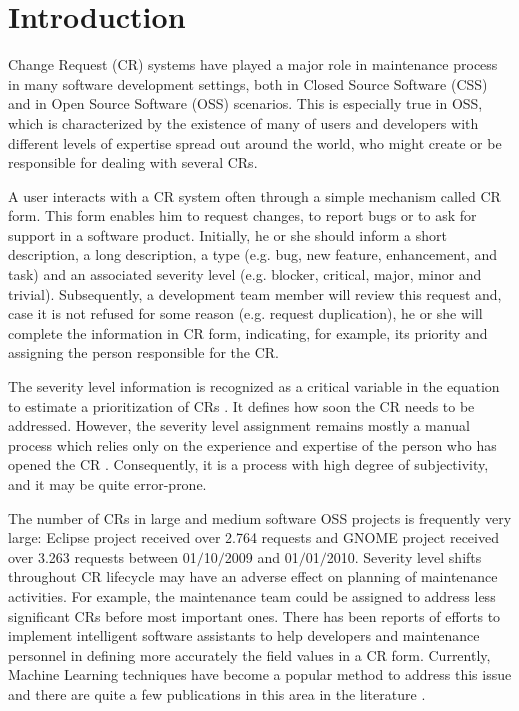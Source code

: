 \section{Introduction}
Change Request (CR) systems have played a major role in maintenance process in many software development settings, both in Closed Source Software (CSS) and in Open Source Software (OSS) scenarios. This is especially true in OSS, which is characterized by the existence of many of users and developers with different levels of expertise spread out around the world, who might create or be responsible for dealing with several CRs\cite{Cavalcanti2014}.

A user interacts with a CR system often through a simple mechanism called CR form. This form enables him to request changes, to report bugs or to ask for support in a software product\cite{Sommerville2010}. Initially, he or she should inform a short description, a long description, a type (e.g. bug, new feature, enhancement, and task) and an associated severity level (e.g. blocker, critical, major, minor and trivial). Subsequently, a development team member will review this request and, case it is not refused for some reason (e.g. request duplication), he or she will complete the information in CR form, indicating, for example, its priority and assigning the person responsible for the CR. 

The severity level information is recognized as a critical variable in the equation to estimate a prioritization of CRs \cite{Tian2012}. It defines how soon the CR needs to be addressed\cite{Lamkanfi2010}. However, the severity level assignment remains mostly a manual process which relies only on the experience and expertise of the person who has opened the CR \cite{Cavalcanti2014, Tian2012, Lamkanfi2010}. Consequently, it is a process with high degree of subjectivity, and it may be quite error-prone. 

The number of CRs in large and medium software OSS projects is frequently very large\cite{Lamkanfi2011}: Eclipse project received over 2.764 requests and GNOME project received over 3.263 requests between 01$/$10$/$2009 and 01$/$01$/$2010. Severity level shifts throughout CR lifecycle may have an adverse effect on planning of maintenance activities. For example, the maintenance team could be assigned to address less significant CRs before  most important ones. There has been reports \cite{Tian2015} of efforts to implement intelligent software assistants to help developers and maintenance personnel in defining more accurately the field values in a CR form. Currently, Machine Learning techniques have become a popular method to address this issue and there are quite a few publications in this area in the literature \cite{Cavalcanti2014}. 

